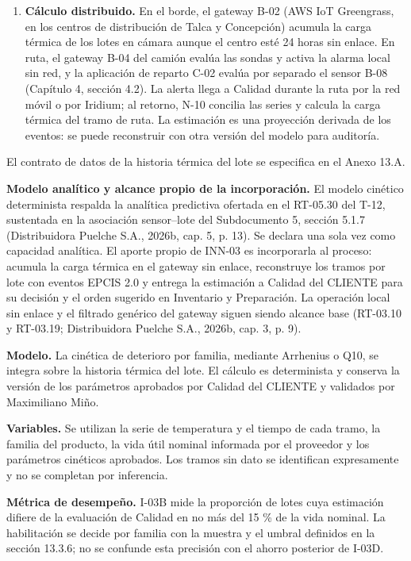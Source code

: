 \begin{enumerate}
  \item \textbf{Cálculo distribuido.} En el borde, el gateway B-02 (AWS IoT Greengrass, en los centros de distribución de Talca y Concepción) acumula la carga térmica de los lotes en cámara aunque el centro esté 24 horas sin enlace. En ruta, el gateway B-04 del camión evalúa las sondas y activa la alarma local sin red, y la aplicación de reparto C-02 evalúa por separado el sensor B-08 (Capítulo 4, sección 4.2). La alerta llega a Calidad durante la ruta por la red móvil o por Iridium; al retorno, N-10 concilia las series y calcula la carga térmica del tramo de ruta. La estimación es una proyección derivada de los eventos: se puede reconstruir con otra versión del modelo para auditoría.
\end{enumerate}

El contrato de datos de la historia térmica del lote se especifica en el Anexo 13.A.

\textbf{Modelo analítico y alcance propio de la incorporación.} El modelo cinético determinista respalda la analítica predictiva ofertada en el RT-05.30 del T-12, sustentada en la asociación sensor–lote del Subdocumento 5, sección 5.1.7 (Distribuidora Puelche S.A., 2026b, cap. 5, p. 13). Se declara una sola vez como capacidad analítica. El aporte propio de INN-03 es incorporarla al proceso: acumula la carga térmica en el gateway sin enlace, reconstruye los tramos por lote con eventos EPCIS 2.0 y entrega la estimación a Calidad del CLIENTE para su decisión y el orden sugerido en Inventario y Preparación. La operación local sin enlace y el filtrado genérico del gateway siguen siendo alcance base (RT-03.10 y RT-03.19; Distribuidora Puelche S.A., 2026b, cap. 3, p. 9).

\label{sec:sd13-modelo-termico}

\textbf{Modelo.} La cinética de deterioro por familia, mediante Arrhenius o Q10, se integra sobre la historia térmica del lote. El cálculo es determinista y conserva la versión de los parámetros aprobados por Calidad del CLIENTE y validados por Maximiliano Miño.

\textbf{Variables.} Se utilizan la serie de temperatura y el tiempo de cada tramo, la familia del producto, la vida útil nominal informada por el proveedor y los parámetros cinéticos aprobados. Los tramos sin dato se identifican expresamente y no se completan por inferencia.

\textbf{Métrica de desempeño.} I-03B mide la proporción de lotes cuya estimación difiere de la evaluación de Calidad en no más del 15 \% de la vida nominal. La habilitación se decide por familia con la muestra y el umbral definidos en la sección 13.3.6; no se confunde esta precisión con el ahorro posterior de I-03D.

